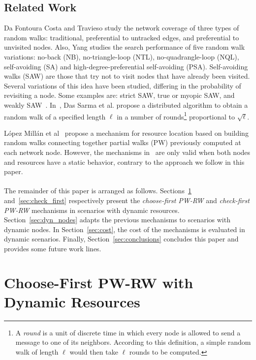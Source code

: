 \documentclass[]{elsarticle}
\begin{document}
\subsection{Related Work}

Da Fontoura Costa and Travieso \cite{rw:Costa07} study the network coverage of three types of random walks: traditional, preferential to untracked edges, and preferential to unvisited nodes. Also, Yang \cite{rw:Yang05} studies the search performance of five random walk variations: no-back (NB), no-triangle-loop (NTL), no-quadrangle-loop (NQL), self-avoiding (SA) and high-degree-preferential self-avoiding (PSA). Self-avoiding walks (SAW) are those that try not to visit nodes that have already been visited. Several variations of this idea have been studied, differing in the probability of revisiting a node. Some examples are: strict SAW, true or myopic SAW, and weakly SAW~\cite{rw:Amit83,rw:Slade09}. In~\cite{rw:DasSarma10}, Das Sarma et al. propose a distributed algorithm to obtain a random walk of a specified length $\ell$ in a number of rounds\footnote{A \emph{round} is a unit of discrete time in which every node is allowed to send a message to one of its neighbors. According to this definition, a simple random walk of length $\ell$ would then take $\ell$ rounds to be computed.} proportional to $\sqrt{\ell}$.

L\'opez Mill\'an et al~\cite{Lopez:Computing} propose a mechanism for resource location based on building random walks connecting together partial walks (PW) previously computed at each network node.  However, the mechanisms in~\cite{Lopez:Computing} are only valid when both nodes and resources have a static behavior, contrary to the approach we follow in this paper. \\ \\

The remainder of this paper is arranged as follows. Sections~\ref{sec:choose_first} and~\ref{sec:check_first} respectively present the \emph{choose-first PW-RW} and \emph{check-first PW-RW} mechanisms in scenarios with dynamic resources. Section~\ref{sec:dyn_nodes} adapts the previous mechanisms to scenarios with dynamic nodes. In Section~\ref{sec:cost}, the cost of the mechanisms is evaluated in dynamic scenarios. Finally, Section~\ref{sec:conclusions} concludes this paper and provides some future work lines.

\section{Choose-First PW-RW with Dynamic Resources}
\label{sec:choose_first}
\end{document}
